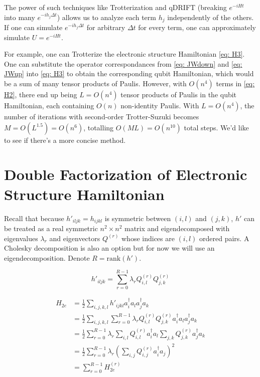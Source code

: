 The power of such techniques like Trotterization and qDRIFT (breaking $e^{-iHt}$ into many $e^{-ih_j\Delta t}$) allows us to analyze each term $h_j$ independently of the others. If one can simulate $e^{-ih_j \Delta t}$ for arbitrary $\Delta t$ for every term, one can approximately simulate $U = e^{-iHt}$.

For example, one can Trotterize the electronic structure Hamiltonian \eqref{eq: H3}. One can substitute the operator correspondances from \eqref{eq: JWdown} and \eqref{eq: JWup} into \eqref{eq: H3} to obtain the corresponding qubit Hamiltonian, which would be a sum of many tensor products of Paulis. However, with $O(n^4)$ terms in \eqref{eq: H2}, there end up being $L = O(n^4)$ tensor products of Paulis in the qubit Hamiltonian, each containing $O(n)$ non-identity Paulis. With $L = O(n^4)$, the number of iterations with second-order Trotter-Suzuki becomes $M = O(L^{1.5}) = O(n^6)$, totalling $O(ML) = O(n^{10})$ total steps. We'd like to see if there's a more concise method.

\section{Double Factorization of Electronic Structure Hamiltonian}

Recall that because $h'_{iljk} = h_{ijkl}$ is symmetric between $(i, l)$ and $(j, k)$, $h'$ can be treated as a real symmetric $n^2 \times n^2$ matrix and eigendecomposed with eigenvalues $\lambda_r$ and eigenvectors $Q^{(r)}$ whose indices are $(i, l)$ ordered pairs. A Cholesky decomposition is also an option but for now we will use an eigendecomposition. Denote $R = \text{rank}{(h')}$.

\begin{equation}
    h'_{iljk} = \sum_{r = 0}^{R - 1} \lambda_r Q^{(r)}_{i, l}Q^{(r)}_{j, k}
\end{equation}

\begin{equation}
    \begin{split}
        H_{2e} &= \frac{1}{2}\sum_{i,j,k,l} h'_{ijkl}a^\dag_ia_la^\dag_ja_k \\
        &= \frac{1}{2}\sum_{i,j,k,l} \sum_{r = 0}^{R - 1} \lambda_r Q^{(r)}_{i, l}Q^{(r)}_{j, k}a^\dag_ia_la^\dag_ja_k \\
        &= \frac{1}{2}\sum_{r = 0}^{R - 1} \lambda_r \sum_{i,l} Q^{(r)}_{i, l}a^\dag_ia_l\sum_{j,k}Q^{(r)}_{j, k}a^\dag_ja_k \\
        &= \frac{1}{2}\sum_{r = 0}^{R - 1}\lambda_r\left(\sum_{i,j} Q^{(r)}_{i, j}a^\dag_ia_j\right)^2 \\
        &= \sum_{r = 0}^{R - 1} H_{2e}^{(r)}
    \end{split}
    \label{eq: DF}
\end{equation}

